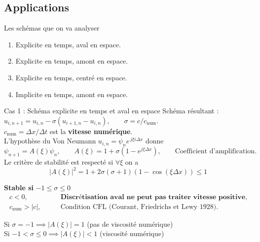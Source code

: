 \documentclass[aspectratio=169, french]{beamer}
\begin{document}
\subsection{Applications}

\begin{frame}{Les schémas que on va analyser}
\begin{enumerate}
	\item Explicite en temps, aval en espace.
	\item Explicite en temps, amont en espace.
	\item Explicite en temps, centré en espace.
	\item Implicite en temps, amont en espace.
\end{enumerate} 
\end{frame}


\begin{frame}{Cas 1 : Schéma explicite en temps et aval en espace}
Schéma résultant : 
$u_{i, n+1} = u_{i, n} - \sigma(u_{i+1, n} - u_{i, n}), \qquad \sigma = c/c_{\mathrm{num}}$. \\ $c_{\mathrm{num}} = \Delta x/\Delta t$ est la \textbf{vitesse numérique}. \\
L'hypothèse du Von Neumann $u_{i, n} = \psi_n e^{\, j  \xi  i  \Delta x}$ donne 
\begin{equation*}
\psi_{n+1} = A(\xi) \psi_n, \qquad	A(\xi) = 1 + \sigma(1 - e^{j  \xi \Delta x}), \qquad \text{Coefficient d'amplification}.
\end{equation*}
Le critère de stabilité est respecté si $\forall \xi$ on a
\begin{equation*}
	|A(\xi)|^2 = 1 + 2 \sigma(\sigma + 1)(1 - \cos(\xi \Delta x))\le 1   
\end{equation*}
\begin{tcolorbox}[title=Conditions de stabilité, coltitle=white]
		 \textbf{Stable si } $-1 \le \sigma \le 0$
\begin{equation*}
	\begin{aligned}
		c<0, \\
		c_{\mathrm{num}}>|c|, 
	\end{aligned}
	\qquad 
	\begin{aligned}
		\textbf{Discrétisation aval ne peut pas traiter vitesse positive}, \\
		\text{Condition CFL (Courant, Friedrichs et Lewy 1928).}
	\end{aligned}
\end{equation*}

\end{tcolorbox}

Si $\sigma=-1 \implies |A(\xi)|=1$ \hspace{.5cm} (pas de viscosité numérique)\\
Si $-1 < \sigma \le 0 \implies |A(\xi)|<1$ \hspace{.5cm} (viscosité numérique)

\end{frame}
\end{document}
